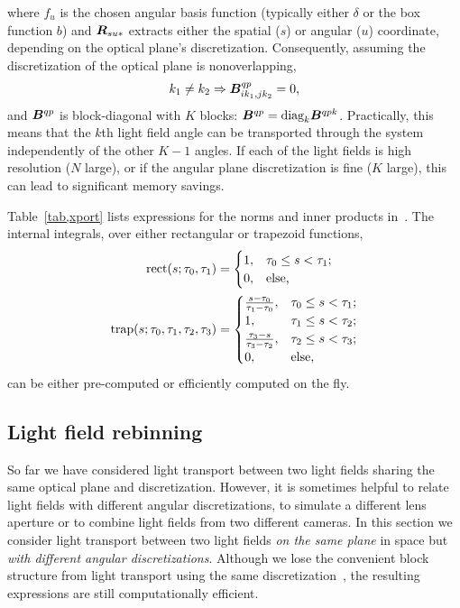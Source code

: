 where $f_u$ is the chosen angular basis function (typically either 
$\delta$ or the box function $b$) and ${\bm{R}}_{su*}$ extracts either the
spatial ($s$) or angular ($u$) coordinate, depending on the optical
plane's discretization.  Consequently, assuming the discretization of the
optical plane is nonoverlapping,
\begin{align}
    k_1 \ne k_2 \Rightarrow {\ensuremath{\bm{B}}}^{qp}_{ik_1, jk_2} = 0,
    \label{eqn,xport,block}
\end{align}
and ${\bm{B}}^{qp}$ is block-diagonal with $K$ blocks: ${\bm{B}}^{qp} = \text{diag}_{k}
{\bm{B}}^{qpk}$.  Practically, this means that the $k$th light field angle can be
transported through the system independently of the other $K-1$ angles. If each
of the light fields is high resolution ($N$ large), or if the angular plane
discretization is fine ($K$ large), this can lead to significant memory savings.

Table~\ref{tab,xport} lists expressions for the norms and inner products
in~.  The internal integrals, over either rectangular or 
trapezoid functions,
\begin{align}
    \text{rect} {\left( s; \tau_0, \tau_1 \right)}
    &=
    \begin{cases}
        1, & \tau_0 \le s < \tau_1; \\
        0, & \text{else,}
    \end{cases}
    \nonumber \\
    \text{trap} {\left( s; \tau_0, \tau_1, \tau_2, \tau_3 \right)}
    &=
    \begin{cases}
        \frac{s - \tau_0}{\tau_1 - \tau_0}, & \tau_0 \le s < \tau_1; \\
        1, & \tau_1 \le s < \tau_2; \\
        \frac{\tau_3 - s}{\tau_3 - \tau_2}, & \tau_2 \le s < \tau_3; \\
        0, & \text{else,}
    \end{cases}
    \label{eqn,rect,trap}
\end{align}
can be either pre-computed or efficiently computed on the fly.



\subsection{Light field rebinning}

So far we have considered light transport between two light fields sharing the
same optical plane and discretization.  However, it is sometimes helpful to
relate light fields with different angular discretizations, \eg to simulate a
different lens aperture or to combine light fields from two different cameras.
In this section we consider light transport between two light fields {\it on
the same plane} in space but {\it with different angular discretizations}.
Although we lose the convenient block structure from light transport using the
same discretization~, the resulting expressions are 
still computationally efficient.

